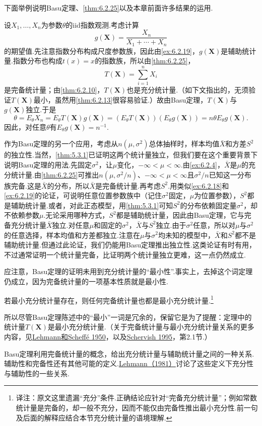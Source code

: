 下面举例说明Basu定理、\autoref{thm:6.2.25}以及本章前面许多结果的运用.
\begin{example}[Basu定理的运用——I]\label{ex:6.2.26}
设$X_1,\ldots,X_n$为参数$\theta$的iid指数观测.考虑计算
$$g(\boldsymbol X)=\frac{X_n}{X_1+\cdots+X_n}$$
的期望值.先注意指数分布构成尺度参数族，因此由\autoref{ex:6.2.19}，$g(\boldsymbol X)$是辅助统计量.指数分布也构成$t(x)=x$的指数族，所以由\autoref{thm:6.2.25}，
$$T(\boldsymbol X)=\sum_{i=1}^nX_i$$
是完备统计量；由\autoref{thm:6.2.10}，$T(\boldsymbol X)$也是充分统计量.（如下文指出的，无须验证$T(\boldsymbol X)$最小，虽然用\autoref{thm:6.2.13}很容易验证.）故由Basu定理，$T(\boldsymbol X)$与$g(\boldsymbol X)$独立.于是
$$\theta=E_\theta X_n=E_\theta T(\boldsymbol X)g(\boldsymbol X)=(E_\theta T(\boldsymbol X))(E_\theta g(\boldsymbol X))=n\theta E_\theta g(\boldsymbol X).$$
因此，对任意$\theta$有$E_\theta g(\boldsymbol X)=n^{-1}$.
\end{example}
\begin{example}[Basu定理的运用——II]\label{ex:6.2.27}
作为Basu定理的另一个应用，考虑从$n(\mu,\sigma^2)$总体抽样时，样本均值$\bar X$和方差$S^2$的独立性.当然，\autoref{thm:5.3.1}已证明这两个统计量独立，但我们要在这个重要背景下说明Basu定理的用法.先固定$\sigma^2$，让$\mu$变化，$-\infty<\mu<\infty$.由\autoref{ex:6.2.4}，$\bar X$是$\mu$的充分统计量.由\autoref{thm:6.2.25}可推出$n(\mu,\sigma^2/n)$、$-\infty<\mu<\infty$且$\sigma^2/n$已知这一分布族完备.这是$\bar X$的分布，所以$\bar X$是完备统计量.再考虑$S^2$.用类似\autoref{ex:6.2.18}和\autoref{ex:6.2.19}的论证，可说明任意位置参数族中（记住$\sigma^2$固定，$\mu$为位置参数），$S^2$都是辅助统计量.或者，对此正态模型，用\autoref{thm:5.3.1}可知$S^2$的分布依赖固定量$\sigma^2$，却不依赖参数$\mu$.无论采用哪种方式，$S^2$都是辅助统计量，因此由Basu定理，它与完备充分统计量$\bar X$独立.对任意$\mu$和固定的$\sigma^2$，$\bar X$与$S^2$独立.由于$\sigma^2$任意，所以对$\mu$与$\sigma^2$的任意选择，样本均值和方差都独立.注意在$\mu$与$\sigma^2$均未知的模型中，$\bar X$和$S^2$都不是辅助统计量.但通过此论证，我们仍能用Basu定理推出独立性.这类论证有时有用，不过通常证明一个统计量完备，比证明两个统计量独立更难，这一点仍然成立.
\end{example}
应注意，Basu定理的证明未用到充分统计量的“最小性”.事实上，去掉这个词定理仍成立，因为完备统计量的一项基本性质就是最小性.
\begin{theorem}\label{thm:6.2.28}
若最小充分统计量存在，则任何完备统计量也都是最小充分统计量.\footnote{译注：原文这里遗漏“充分”条件.正确结论应针对“完备充分统计量”；例如常数统计量是完备的，却一般不充分，因而不能仅由完备性推出最小充分性.前一句及后面的解释应结合本节充分统计量的语境理解.}
\end{theorem}
所以尽管Basu定理陈述中的“最小”一词是冗余的，保留它是为了提醒：定理中的统计量$T(\boldsymbol X)$是最小充分统计量.（关于完备统计量与最小充分统计量关系的更多内容，见\hyperref[bib:source201]{Lehmann和Scheffé 1950}，以及\hyperref[bib:source276]{Schervish 1995}，第2.1节.）

Basu定理利用完备统计量的概念，给出充分统计量与辅助统计量之间的一种关系.辅助性和完备性还有其他可能的定义.\hyperref[bib:source197]{Lehmann（1981）}讨论了这些定义下充分性与辅助性的一些关系.
